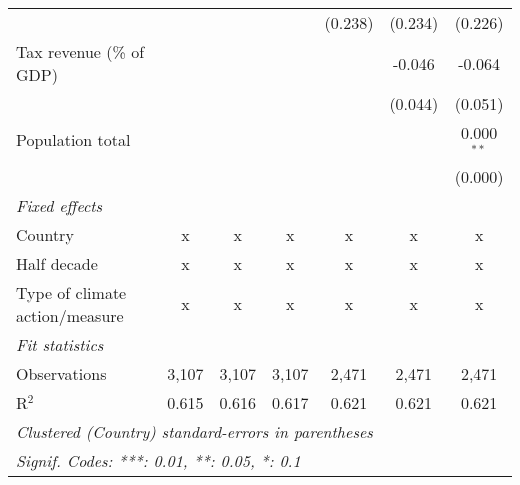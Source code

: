 \begin{tabular}{lcccccc}
                                                           &         &               &                & (0.238)        & (0.234)        & (0.226)\\   
   Tax revenue (\% of GDP)                                 &         &               &                &                & -0.046         & -0.064\\   
                                                           &         &               &                &                & (0.044)        & (0.051)\\   
   Population total                                        &         &               &                &                &                & 0.000$^{**}$\\   
                                                           &         &               &                &                &                & (0.000)\\   
   \emph{Fixed effects}\\
   Country                                                 & x       & x             & x              & x              & x              & x\\  
   Half decade                                             & x       & x             & x              & x              & x              & x\\  
   Type of climate action/measure                          & x       & x             & x              & x              & x              & x\\  
   \midrule \emph{Fit statistics}\\
   Observations                                            & 3,107   & 3,107         & 3,107          & 2,471          & 2,471          & 2,471\\  
   R$^2$                                                   & 0.615   & 0.616         & 0.617          & 0.621          & 0.621          & 0.621\\  
   \midrule
   \multicolumn{7}{l}{\emph{Clustered (Country) standard-errors in parentheses}}\\
   \multicolumn{7}{l}{\emph{Signif. Codes: ***: 0.01, **: 0.05, *: 0.1}}\\
\end{tabular}
\par\endgroup


